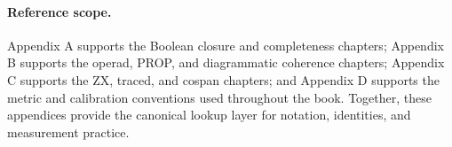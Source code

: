 \documentclass[11pt]{article}
\begin{document}
\paragraph{Reference scope.} Appendix A supports the Boolean closure and completeness chapters; Appendix B supports the operad, PROP, and diagrammatic coherence chapters; Appendix C supports the ZX, traced, and cospan chapters; and Appendix D supports the metric and calibration conventions used throughout the book. Together, these appendices provide the canonical lookup layer for notation, identities, and measurement practice.
\end{document}
